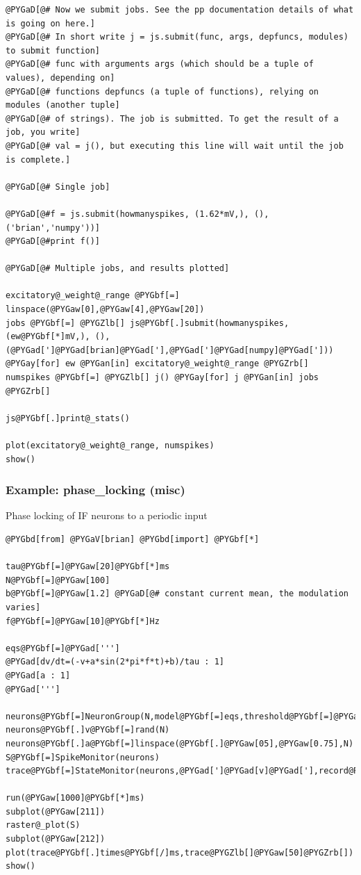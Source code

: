 \documentclass[letterpaper,10pt,english]{manual}
\begin{document}
\begin{Verbatim}[commandchars=@\[\]]
@PYGaD[@# Now we submit jobs. See the pp documentation details of what is going on here.]
@PYGaD[@# In short write j = js.submit(func, args, depfuncs, modules) to submit function]
@PYGaD[@# func with arguments args (which should be a tuple of values), depending on]
@PYGaD[@# functions depfuncs (a tuple of functions), relying on modules (another tuple]
@PYGaD[@# of strings). The job is submitted. To get the result of a job, you write]
@PYGaD[@# val = j(), but executing this line will wait until the job is complete.]

@PYGaD[@# Single job]

@PYGaD[@#f = js.submit(howmanyspikes, (1.62*mV,), (), ('brian','numpy'))]
@PYGaD[@#print f()]

@PYGaD[@# Multiple jobs, and results plotted]

excitatory@_weight@_range @PYGbf[=] linspace(@PYGaw[0],@PYGaw[4],@PYGaw[20])
jobs @PYGbf[=] @PYGZlb[] js@PYGbf[.]submit(howmanyspikes, (ew@PYGbf[*]mV,), (), (@PYGad[']@PYGad[brian]@PYGad['],@PYGad[']@PYGad[numpy]@PYGad['])) @PYGay[for] ew @PYGan[in] excitatory@_weight@_range @PYGZrb[]
numspikes @PYGbf[=] @PYGZlb[] j() @PYGay[for] j @PYGan[in] jobs @PYGZrb[]

js@PYGbf[.]print@_stats()

plot(excitatory@_weight@_range, numspikes)
show()
\end{Verbatim}

\resetcurrentobjects
\hypertarget{--doc-examples-misc_phase_locking}{}

\hypertarget{index-75}{}\subsubsection{Example: phase\_locking (misc)}

Phase locking of IF neurons to a periodic input

\begin{Verbatim}[commandchars=@\[\]]
@PYGbd[from] @PYGaV[brian] @PYGbd[import] @PYGbf[*]

tau@PYGbf[=]@PYGaw[20]@PYGbf[*]ms
N@PYGbf[=]@PYGaw[100]
b@PYGbf[=]@PYGaw[1.2] @PYGaD[@# constant current mean, the modulation varies]
f@PYGbf[=]@PYGaw[10]@PYGbf[*]Hz

eqs@PYGbf[=]@PYGad[''']
@PYGad[dv/dt=(-v+a*sin(2*pi*f*t)+b)/tau : 1]
@PYGad[a : 1]
@PYGad[''']

neurons@PYGbf[=]NeuronGroup(N,model@PYGbf[=]eqs,threshold@PYGbf[=]@PYGaw[1],reset@PYGbf[=]@PYGaw[0])
neurons@PYGbf[.]v@PYGbf[=]rand(N)
neurons@PYGbf[.]a@PYGbf[=]linspace(@PYGbf[.]@PYGaw[05],@PYGaw[0.75],N)
S@PYGbf[=]SpikeMonitor(neurons)
trace@PYGbf[=]StateMonitor(neurons,@PYGad[']@PYGad[v]@PYGad['],record@PYGbf[=]@PYGaw[50])

run(@PYGaw[1000]@PYGbf[*]ms)
subplot(@PYGaw[211])
raster@_plot(S)
subplot(@PYGaw[212])
plot(trace@PYGbf[.]times@PYGbf[/]ms,trace@PYGZlb[]@PYGaw[50]@PYGZrb[])
show()
\end{Verbatim}
\end{document}
